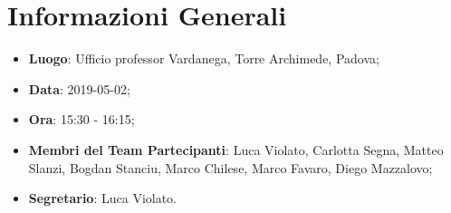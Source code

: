 \section{Informazioni Generali}
\begin{itemize}
	\item \textbf{Luogo}: Ufficio professor Vardanega, Torre Archimede, Padova; 
	\item \textbf{Data}: 2019-05-02;
	\item \textbf{Ora}: 15:30 - 16:15;
	\item \textbf{Membri del Team Partecipanti}: Luca Violato, Carlotta Segna, Matteo Slanzi, Bogdan Stanciu, Marco Chilese, Marco Favaro, Diego Mazzalovo; 
	\item \textbf{Segretario}: Luca Violato. 
\end{itemize}


